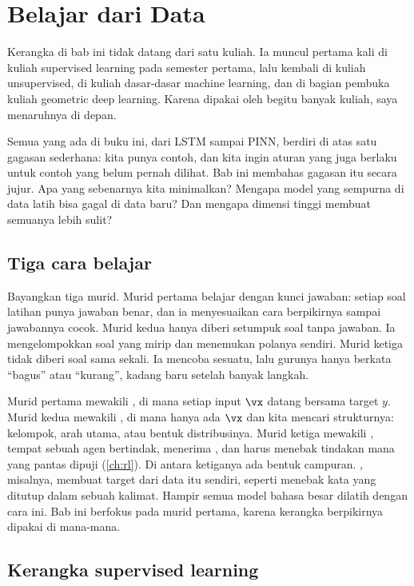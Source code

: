 \chapter{Belajar dari Data}
\label{ch:data}

Kerangka di bab ini tidak datang dari satu kuliah. Ia muncul pertama kali di kuliah supervised
learning pada semester pertama, lalu kembali di kuliah unsupervised, di kuliah dasar-dasar
machine learning, dan di bagian pembuka kuliah geometric deep learning. Karena dipakai oleh
begitu banyak kuliah, saya menaruhnya di depan.

Semua yang ada di buku ini, dari LSTM sampai PINN, berdiri di atas satu gagasan sederhana:
kita punya contoh, dan kita ingin aturan yang juga berlaku untuk contoh yang belum pernah
dilihat. Bab ini membahas gagasan itu secara jujur. Apa yang sebenarnya kita minimalkan?
Mengapa model yang sempurna di data latih bisa gagal di data baru? Dan mengapa dimensi tinggi
membuat semuanya lebih sulit?

\section{Tiga cara belajar}

Bayangkan tiga murid. Murid pertama belajar dengan kunci jawaban: setiap soal latihan punya
jawaban benar, dan ia menyesuaikan cara berpikirnya sampai jawabannya cocok. Murid kedua hanya
diberi setumpuk soal tanpa jawaban. Ia mengelompokkan soal yang mirip dan menemukan polanya
sendiri. Murid ketiga tidak diberi soal sama sekali. Ia mencoba sesuatu, lalu gurunya hanya
berkata ``bagus'' atau ``kurang'', kadang baru setelah banyak langkah.

Murid pertama mewakili , di mana setiap input $\vx$ datang bersama
target $y$. Murid kedua mewakili , di mana hanya ada $\vx$ dan kita
mencari strukturnya: kelompok, arah utama, atau bentuk distribusinya. Murid ketiga mewakili
, tempat sebuah agen bertindak, menerima , dan harus
menebak tindakan mana yang pantas dipuji (\cref{ch:rl}). Di antara ketiganya ada bentuk
campuran. , misalnya, membuat target dari data itu sendiri, seperti
menebak kata yang ditutup dalam sebuah kalimat. Hampir semua model bahasa besar dilatih dengan
cara ini. Bab ini berfokus pada murid pertama, karena kerangka berpikirnya dipakai di mana-mana.

\section{Kerangka supervised learning}

